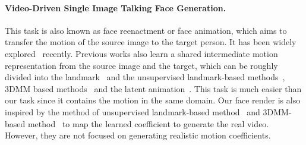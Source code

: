  \paragraph{Video-Driven Single Image Talking Face Generation.} This task is also known as face reenactment or face animation, which aims to transfer the motion of the source image to the target person. It has been widely explored~\cite{fomm, mraa, ren2021pirenderer, facevid2vid, fewshotvid2vid, styleheat, dagan, tps, lia, dpe} recently. Previous works also learn a shared intermediate motion representation from the source image and the target, which can be roughly divided into the landmark~\cite{fewshotvid2vid} and the unsupervised landmark-based methods~\cite{fomm, facevid2vid,dagan,tps}, 3DMM based methods~\cite{ren2021pirenderer, styleheat, doukas2020headgan} and the latent animation~\cite{lia, mallya2022implicit}. This task is much easier than our task since it contains the motion in the same domain. Our face render is also inspired by the method of unsupervised landmark-based method~\cite{facevid2vid} and 3DMM-based method~\cite{ren2021pirenderer} to map the learned coefficient to generate the real video. However, they are not focused on generating realistic motion coefficients.